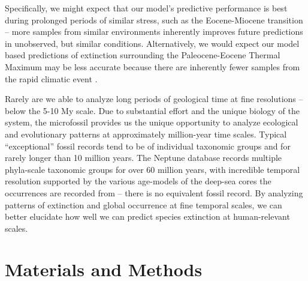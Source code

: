 \documentclass[12pt,letterpaper]{article}
\begin{document}

Specifically, we might expect that our model's predictive performance is best during prolonged periods of similar stress, such as the Eocene-Miocene transition \citep{Zachos2008} -- more samples from similar environments inherently improves future predictions in unobserved, but similar conditions. Alternatively, we would expect our model based predictions of extinction surrounding the Paleocene-Eocene Thermal Maximum may be less accurate because there are inherently fewer samples from the rapid climatic event \citep{Zachos2008}.

Rarely are we able to analyze long periods of geological time at fine resolutions -- below the 5-10 My scale. Due to substantial effort and the unique biology of the system, the microfossil provides us the unique opportunity to analyze ecological and evolutionary patterns at approximately million-year time scales. Typical ``exceptional'' fossil records tend to be of individual taxonomic groups and for rarely longer than 10 million years. The Neptune database records multiple phyla-scale taxonomic groups for over 60 million years, with incredible temporal resolution supported by the various age-models of the deep-sea cores the occurrences are recorded from -- there is no equivalent fossil record. By analyzing patterns of extinction and global occurrence at fine temporal scales, we can better elucidate how well we can predict species extinction at human-relevant scales.


\section{Materials and Methods}
\end{document}
